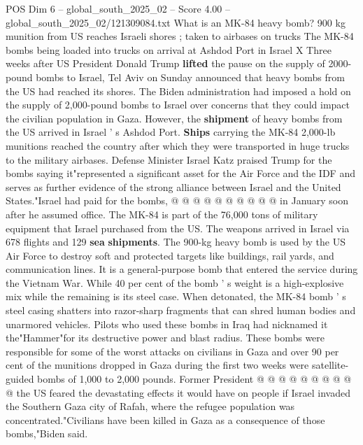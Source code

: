 \begin{textsample}{POS Dim 6 – global\_south\_2025\_02 – Score 4.00 – global\_south\_2025\_02/121309084.txt}  \label{ex:f6_pos_411}
What is an MK-84 heavy bomb? 900 kg munition from US reaches Israeli shores ; taken to airbases on trucks The MK-84 bombs being loaded into trucks on arrival at Ashdod Port in Israel X Three weeks after US President Donald Trump \textbf{lifted} the pause on the supply of 2000-pound bombs to Israel, Tel Aviv on Sunday announced that heavy bombs from the US had reached its shores.
The Biden administration had imposed a hold on the supply of 2,000-pound bombs to Israel over concerns that they could impact the civilian population in Gaza.
However, the \textbf{shipment} of heavy bombs from the US arrived in Israel ' s Ashdod Port. \textbf{Ships} carrying the MK-84 2,000-lb munitions reached the country after which they were transported in huge trucks to the military airbases.
Defense Minister Israel Katz praised Trump for the bombs saying it"represented a significant asset for the Air Force and the IDF and serves as further evidence of the strong alliance between Israel and the United States."Israel had paid for the bombs, @ @ @ @ @ @ @ @ @ @ in January soon after he assumed office.
The MK-84 is part of the 76,000 tons of military equipment that Israel purchased from the US.
The weapons arrived in Israel via 678 flights and 129 \textbf{sea} \textbf{shipments}.
The 900-kg heavy bomb is used by the US Air Force to destroy soft and protected targets like buildings, rail yards, and communication lines.
It is a general-purpose bomb that entered the service during the Vietnam War.
While 40 per cent of the bomb ' s weight is a high-explosive mix while the remaining is its steel case.
When detonated, the MK-84 bomb ' s steel casing shatters into razor-sharp fragments that can shred human bodies and unarmored vehicles.
Pilots who used these bombs in Iraq had nicknamed it the"Hammer"for its destructive power and blast radius.
These bombs were responsible for some of the worst attacks on civilians in Gaza and over 90 per cent of the munitions dropped in Gaza during the first two weeks were satellite-guided bombs of 1,000 to 2,000 pounds.
Former President @ @ @ @ @ @ @ @ @ @ the US feared the devastating effects it would have on people if Israel invaded the Southern Gaza city of Rafah, where the refugee population was concentrated."Civilians have been killed in Gaza as a consequence of those bombs,"Biden said.

\end{textsample}

